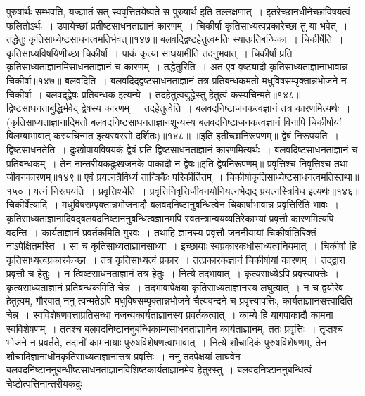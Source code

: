 पुरुषार्थः सम्भवति, यज्ज्ञातं सत् स्ववृत्तितयेष्यते स पुरुषार्थ इति तल्लक्षणात्~। इतरेच्छानधीनेच्छाविषयत्वं फलितोऽर्थः~।
उपायेच्छां प्रतीष्टसाधनताज्ञानं कारणम्~।
चिकीर्षा कृतिसाध्यत्वप्रकारेच्छा तु या भवेत्~।
तद्धेतुः कृतिसाध्येष्टसाधनत्वमतिर्भवत्॥१४७॥
बलवद्द्विष्टहेतुत्वमतिः स्यात्प्रतिबन्धिका~।
चिकीर्षेति~। कृतिसाध्यविषयिणीच्छा चिकीर्षा~। पाकं कृत्या साधयामीति तदनुभवात्~। चिकीर्षां प्रति कृतिसाध्यताज्ञानमिसाधनताज्ञानं च कारणम्~। तद्धेतुरिति~।
अत एव वृष्ट्यादौ कृतिसाध्यताज्ञानाभावान्न चिकीर्षा॥१४७॥
बलवदिति~। बलवदिद्द्वष्टसाधनताज्ञानं तत्र प्रतिबन्धकमतो मधुविषसम्पृक्तान्नभोजने न चिकीर्षा~। बलवद्द्वेषः प्रतिबन्धक इत्यन्ये~।
तदहेतुत्वबुद्धेस्तु हेतुत्वं कस्यचिन्मते॥१४८॥
द्विष्टसाधनताबुद्धिर्भवेद् द्वेषस्य कारणम्~।
तदहेतुत्वेति~। बलवदनिष्टाजनकत्वज्ञानं तत्र कारणमित्यर्थः~। (कृतिसाध्यताज्ञानादिमतो बलवदनिष्टसाधनताज्ञानशून्यस्य बलवदनिष्टाजनकत्वज्ञानं विनापि
चिकीर्षायां विलम्बाभावात् कस्यचिन्मत इत्यस्वरसो दर्शितः)॥१४८॥
॥इति इतीच्छानिरूपणम्॥
द्वेषं निरूपयति~। द्विष्टसाधनतेति~। दुःखोपायविषयकं द्वेषं प्रति द्विष्टसाधनताज्ञानं कारणमित्यर्थः~। बलवदिष्टसाधनताज्ञानं च प्रतिबन्धकम्~। तेन नान्तरीयकदुःखजनके
पाकादौ न द्वेषः॥इति द्वेषनिरूपणम्॥
प्रवृत्तिश्च निवृत्तिश्च तथा जीवनकारणम्॥१४९॥
एवं प्रयत्नत्रैविध्यं तान्त्रिकैः परिकीर्तितम्~।
चिकीर्षाकृतिसाध्येष्टसाधनत्वमतिस्तथा॥१५०॥
यत्नं निरूपयति~। प्रवृत्तिश्चेति~। प्रवृत्तिनिवृत्तिजीवनयोनियत्नभेेदाद् प्रयत्नस्त्रिविध इत्यर्थः॥१४६॥
चिकीर्षेत्यादि~। मधुविषसम्पृक्तान्नभोजनादौ बलवदनिष्टानुबन्धित्वेन चिकार्षाभावान्न प्रवृत्तिरिति भावः~। कृतिसाध्यताज्ञानादिवद्बलवदनिष्टाननुबन्धित्वज्ञानमपि
स्वतन्त्रान्वयव्यतिरेकाभ्यां प्रवृत्तौ कारणमित्यपि वदन्ति~।
कार्यताज्ञानं प्रवर्तकमिति गुरवः~। तथाहि-ज्ञानस्य प्रवृत्तौ जननीयायां चिकीर्षातिरिक्तं नाऽपेक्षितमस्ति~। सा च कृतिसाध्यताज्ञानसाध्या~। इच्छायाः
स्वप्रकारकधीसाध्यत्वनियमात्~। चिकीर्षा हि कृतिसाध्यत्वप्रकारकेच्छा~। तत्र कृतिसाध्यत्वं प्रकार~। तत्प्रकारकज्ञानं चिकीर्षायां कारणम्~। तद्द्वारा प्रवृत्तौ च हेतुः~। न
त्विष्टसाधनताज्ञानं तत्र हेतुः~। नित्ये तदभावात्~। कृत्यसाध्येऽपि प्रवृत्त्यापत्तेः~। कृत्यसाध्यताज्ञानं प्रतिबन्धकमिति चेन्न~। तदभावापेक्षया कृतिसाध्यताज्ञानस्य लघुत्वात्~। न
च द्वयोरेव हेतुत्वम्, गौरवात् ननु त्वन्मतेऽपि मधुविषसम्पृक्तान्नभोजने चैत्यवन्दने च प्रवृत्त्यापत्तिः, कार्यताज्ञानसत्त्वादिति चेन्न~। स्वविशेषणवत्ताप्रतिसन्धा
नजन्यकार्यताज्ञानस्य प्रवर्तकत्वात्~। काम्ये हि यागपाकादौ कामना स्वविशेषणम्~। ततश्च बलवदनिष्टाननुबन्धिकाम्यसाधनताज्ञानेन कार्यताज्ञानम्, ततः प्रवृत्तिः~।
तृप्तश्च भोजने न प्रवर्ततेे, तदानीं कामनायाः पुरुषविशेषणत्वाभावात्~। नित्ये शौचादिकं पुरुषविशेषणम्, तेन शौचादिज्ञानाधीनकृतिसाध्यताज्ञानात्तत्र प्रवृत्तिः~। ननु
तदपेक्षयां लाघवेन बलवदनिष्टाननुबन्धीष्टसाधनताज्ञानविशिष्टकार्यताज्ञानमेव हेतुरस्तु~। बलवदनिष्टाननुबन्धित्वं चेष्टोत्पत्तिनान्तरीयकदुः
